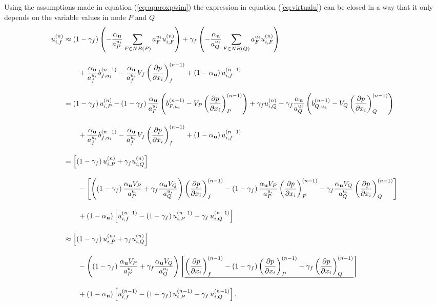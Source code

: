 Using the assumptions made in equation (\ref{eq:approxpwim}) the expression in equation (\ref{eq:virtualu}) can be closed in a way that it only depends on the variable values in node \(P\) and \(Q\)
\begin{align}
  \allowdisplaybreaks
  \label{eq:closepwim}
  u_{i,f}^{(n)} 
  &\approx 
  \left(1-\gamma_f\right)  \left( -\frac{\alpha_\vec{u}}{a_P^{u_i}} \sum_{F \in NB(P)} a_F^{u_i} u_{i,F}^{(n)} \right)
  +\gamma_f  \left( -\frac{\alpha_\vec{u}}{a_Q^{u_i}} \sum_{F \in NB(Q)} a_F^{u_i} u_{i,F}^{(n)}  \right) \nonumber \\[1em]
  &\quad\quad+ \frac{\alpha_\vec{u}}{a_f^{u_i}}b_{f,u_i}^{(n-1)} 
  - \frac{\alpha_{\vec{u}}}{a_f^{u_i}}V_f\left(\frac{\partial p}{\partial x_i}\right)_f^{(n-1)} 
  + \left(1 - \alpha_{\vec{u}}\right) u_{i,f}^{(n-1)} \nonumber \\[1em]
  &=
  \left(1-\gamma_f\right) u_{i,P}^{(n)} - \left(1 - \gamma_f\right) \frac{\alpha_{\vec{u}}}{a_P^{u_i}}\left(  b_{P,u_i}^{(n-1)} - V_P \left(\frac{\partial p}{\partial x_i}\right)_P^{(n-1)} \right) 
  +\gamma_f  u_{i,Q}^{(n)} - \gamma_f \frac{\alpha_{\vec{u}}}{a_Q^{u_i}} \left( b_{Q,u_i}^{(n-1)} - V_Q \left(\frac{\partial p}{\partial x_i}\right)_Q^{(n-1)}  \right) \nonumber \\[1em]
  &\quad\quad+ \frac{\alpha_{\vec{u}}}{a_f^{u_i}}b_{f,u_i}^{(n-1)} 
  - \frac{\alpha_{\vec{u}}}{a_f^{u_i}}V_f\left(\frac{\partial p}{\partial x_i}\right)_f^{(n-1)}
  + \left(1 - \alpha_{\vec{u}}\right) u_{i,f}^{(n-1)} \nonumber \\[1em]
  &=
  \left[\left(1 - \gamma_f\right) u_{i,P}^{(n)} + \gamma_f u_{i,Q}^{(n)} \right] \nonumber\\[1em]
  &\quad\quad - 
  \left[ 
  \left(\left(1 - \gamma_f\right) \frac{\alpha_\vec{u} V_P}{a_P^{u_i}} + \gamma_f \frac{\alpha_\vec{u} V_Q}{a_Q^{u_i}}\right)
  \left(\frac{\partial p}{\partial x_i}\right)_f^{(n-1)} 
  - \left(1 - \gamma_f \right) \frac{\alpha_\vec{u} V_P}{a_P^{u_i}}\left( \frac{\partial p}{\partial x_i} \right)_P^{(n-1)} 
  - \gamma_f \frac{\alpha_\vec{u} V_Q}{a_Q^{u_i}}\left(\frac{\partial p}{\partial x_i}\right)_Q^{(n-1)}
  \right] \nonumber \\[1em]
  &\quad\quad + \left(1 - \alpha_\vec{u}\right) \left[ u_{i,f}^{(n-1)} - \left(1 - \gamma_f\right) u_{i,P}^{(n-1)} - \gamma_f \, u_{i,Q}^{(n-1)} \right] \nonumber \\[1em]
  &\approx
  \left[\left(1 - \gamma_f\right) u_{i,P}^{(n)} + \gamma_f u_{i,Q}^{(n)} \right] \nonumber\\[1em]
  &\quad\quad - 
  \left(\left(1 - \gamma_f\right) \frac{\alpha_\vec{u} V_P}{a_P^{u_i}} + \gamma_f \frac{\alpha_\vec{u} V_Q}{a_Q^{u_i}}\right)
  \left[ 
    \underline{\left(\frac{\partial p}{\partial x_i}\right)_f^{(n-1)} 
  - \left(1 - \gamma_f \right) \left( \frac{\partial p}{\partial x_i} \right)_P^{(n-1)} 
- \gamma_f \left(\frac{\partial p}{\partial x_i}\right)_Q^{(n-1)}}
  \right] \nonumber \\[1em]
  &\quad\quad + \left(1 - \alpha_\vec{u}\right) \left[ u_{i,f}^{(n-1)} - \left(1 - \gamma_f\right) u_{i,P}^{(n-1)} - \gamma_f \, u_{i,Q}^{(n-1)} \right].
\end{align}
